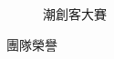 \begin{figure}[H]
\begin{subfigure}{0.31\linewidth}
    \caption{潮創客大賽}
    \label{fig:Awards-2}
  \end{subfigure}
  \caption{團隊榮譽}
\end{figure}